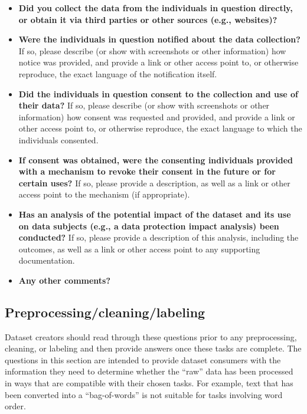 \begin{itemize}


\item \textbf{Did you collect the data from the individuals in
    question directly, or obtain it via third parties or other sources
    (e.g., websites)?}

\item \textbf{Were the individuals in question notified about the data
    collection?} If so, please describe (or show with screenshots or
  other information) how notice was provided, and provide a link or
  other access point to, or otherwise reproduce, the exact language of
  the notification itself.

\item \textbf{Did the individuals in question consent to the
    collection and use of their data?} If so, please describe (or show
  with screenshots or other information) how consent was requested and
  provided, and provide a link or other access point to, or otherwise
  reproduce, the exact language to which the individuals consented.

\item \textbf{If consent was obtained, were the consenting individuals
    provided with a mechanism to revoke their consent in the future or
    for certain uses?} If so, please provide a description, as well as
  a link or other access point to the mechanism (if appropriate).

\item \textbf{Has an analysis of the potential impact of the dataset
    and its use on data subjects (e.g., a data protection impact
    analysis) been conducted?} If so, please provide a description of
  this analysis, including the outcomes, as well as a link or other
  access point to any supporting documentation.

\item \textbf{Any other comments?}

\end{itemize}

\subsection{Preprocessing/cleaning/labeling}

Dataset creators should read through these questions prior to any
preprocessing, cleaning, or labeling and then provide answers once
these tasks are complete. The questions in this section are intended
to provide dataset consumers with the information they need to
determine whether the ``raw'' data has been processed in ways that are
compatible with their chosen tasks. For example, text that has been
converted into a ``bag-of-words'' is not suitable for tasks involving
word order.\\

